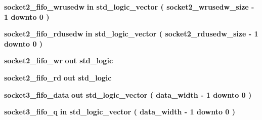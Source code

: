 \begin{DoxyCompactItemize}
\item 
{\bf socket2\+\_\+fifo\+\_\+wrusedw}  {\bfseries {\bfseries \textcolor{keywordflow}{in}\textcolor{vhdlchar}{ }}} {\bfseries \textcolor{comment}{std\+\_\+logic\+\_\+vector}\textcolor{vhdlchar}{ }\textcolor{vhdlchar}{(}\textcolor{vhdlchar}{ }\textcolor{vhdlchar}{ }\textcolor{vhdlchar}{ }\textcolor{vhdlchar}{ }{\bfseries {\bf socket2\+\_\+wrusedw\+\_\+size}} \textcolor{vhdlchar}{-\/}\textcolor{vhdlchar}{ } \textcolor{vhdldigit}{1} \textcolor{vhdlchar}{ }\textcolor{keywordflow}{downto}\textcolor{vhdlchar}{ }\textcolor{vhdlchar}{ } \textcolor{vhdldigit}{0} \textcolor{vhdlchar}{ }\textcolor{vhdlchar}{)}\textcolor{vhdlchar}{ }} 
\item 
{\bf socket2\+\_\+fifo\+\_\+rdusedw}  {\bfseries {\bfseries \textcolor{keywordflow}{in}\textcolor{vhdlchar}{ }}} {\bfseries \textcolor{comment}{std\+\_\+logic\+\_\+vector}\textcolor{vhdlchar}{ }\textcolor{vhdlchar}{(}\textcolor{vhdlchar}{ }\textcolor{vhdlchar}{ }\textcolor{vhdlchar}{ }\textcolor{vhdlchar}{ }{\bfseries {\bf socket2\+\_\+rdusedw\+\_\+size}} \textcolor{vhdlchar}{-\/}\textcolor{vhdlchar}{ } \textcolor{vhdldigit}{1} \textcolor{vhdlchar}{ }\textcolor{keywordflow}{downto}\textcolor{vhdlchar}{ }\textcolor{vhdlchar}{ } \textcolor{vhdldigit}{0} \textcolor{vhdlchar}{ }\textcolor{vhdlchar}{)}\textcolor{vhdlchar}{ }} 
\item 
{\bf socket2\+\_\+fifo\+\_\+wr}  {\bfseries {\bfseries \textcolor{keywordflow}{out}\textcolor{vhdlchar}{ }}} {\bfseries \textcolor{comment}{std\+\_\+logic}\textcolor{vhdlchar}{ }} 
\item 
{\bf socket2\+\_\+fifo\+\_\+rd}  {\bfseries {\bfseries \textcolor{keywordflow}{out}\textcolor{vhdlchar}{ }}} {\bfseries \textcolor{comment}{std\+\_\+logic}\textcolor{vhdlchar}{ }} 
\item 
{\bf socket3\+\_\+fifo\+\_\+data}  {\bfseries {\bfseries \textcolor{keywordflow}{out}\textcolor{vhdlchar}{ }}} {\bfseries \textcolor{comment}{std\+\_\+logic\+\_\+vector}\textcolor{vhdlchar}{ }\textcolor{vhdlchar}{(}\textcolor{vhdlchar}{ }\textcolor{vhdlchar}{ }\textcolor{vhdlchar}{ }\textcolor{vhdlchar}{ }{\bfseries {\bf data\+\_\+width}} \textcolor{vhdlchar}{-\/}\textcolor{vhdlchar}{ } \textcolor{vhdldigit}{1} \textcolor{vhdlchar}{ }\textcolor{keywordflow}{downto}\textcolor{vhdlchar}{ }\textcolor{vhdlchar}{ } \textcolor{vhdldigit}{0} \textcolor{vhdlchar}{ }\textcolor{vhdlchar}{)}\textcolor{vhdlchar}{ }} 
\item 
{\bf socket3\+\_\+fifo\+\_\+q}  {\bfseries {\bfseries \textcolor{keywordflow}{in}\textcolor{vhdlchar}{ }}} {\bfseries \textcolor{comment}{std\+\_\+logic\+\_\+vector}\textcolor{vhdlchar}{ }\textcolor{vhdlchar}{(}\textcolor{vhdlchar}{ }\textcolor{vhdlchar}{ }\textcolor{vhdlchar}{ }\textcolor{vhdlchar}{ }{\bfseries {\bf data\+\_\+width}} \textcolor{vhdlchar}{-\/}\textcolor{vhdlchar}{ } \textcolor{vhdldigit}{1} \textcolor{vhdlchar}{ }\textcolor{keywordflow}{downto}\textcolor{vhdlchar}{ }\textcolor{vhdlchar}{ } \textcolor{vhdldigit}{0} \textcolor{vhdlchar}{ }\textcolor{vhdlchar}{)}\textcolor{vhdlchar}{ }} 

\end{DoxyCompactItemize}
